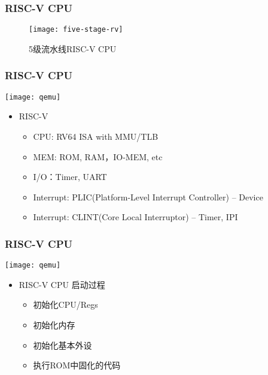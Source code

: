 

\begin{frame}
	\frametitle{RISC-V CPU}

\begin{figure}
\centering
\texttt{[image: five-stage-rv]}

\caption{5级流水线RISC-V CPU}
\end{figure}

\end{frame}

\begin{frame}
	\frametitle{RISC-V CPU}
	\centering
	\texttt{[image: qemu]}
	
	\begin{itemize}
		
		\item RISC-V
		\begin{itemize}
			\item CPU: RV64 ISA with MMU/TLB
			\item MEM: ROM, RAM，IO-MEM, etc
			\item I/O：Timer, UART
			\item Interrupt: PLIC(Platform-Level Interrupt Controller) -- Device
			\item Interrupt: CLINT(Core Local Interruptor) -- Timer, IPI 
		\end{itemize}

	\end{itemize}	
	
\end{frame}


\begin{frame}
	\frametitle{RISC-V CPU}
	\centering
	\texttt{[image: qemu]}	
	\begin{itemize}
		
		\item RISC-V CPU 启动过程
		\begin{itemize}
			\item 初始化CPU/Regs	
			\item 初始化内存
			\item 初始化基本外设
			\item 执行ROM中固化的代码
		\end{itemize}
		
	\end{itemize}	
	
\end{frame}


